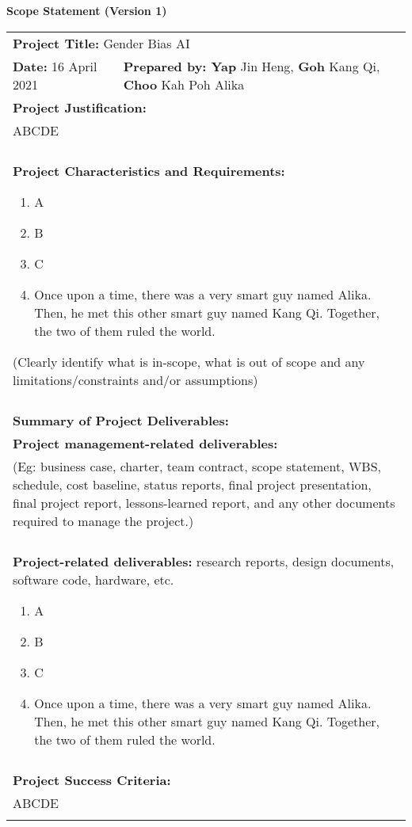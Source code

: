 \begin{center}
    \textbf{Scope Statement (Version 1)}
\end{center}

\begin{longtable}{ | p{} l | }
    \hline
    \multicolumn{2}{|l|}{\textbf{Project Title:} Gender Bias AI} \\
    \textbf{Date:} 16 April 2021 &
    \textbf{Prepared by: Yap} Jin Heng, \textbf{Goh} Kang Qi, \textbf{Choo} Kah Poh Alika \\
    \hline
    \multicolumn{2}{|l|}{\textbf{Project Justification:}} \\
    \multicolumn{2}{|p{\textwidth}|}{ABCDE} \\
    & \\
    \hline
    \multicolumn{2}{|p{\textwidth}|}{\textbf{Project Characteristics and Requirements:}
        \begin{enumerate}
            \item A
            \item B
            \item C
            \item Once upon a time, there was a very smart guy named Alika. Then, he met this other smart guy named Kang Qi. Together, the two of them ruled the world.
        \end{enumerate}
    (Clearly identify what is in-scope, what is out of scope and any limitations/constraints and/or assumptions)
    } \\
    & \\
    \hline
    \multicolumn{2}{|l|}{\textbf{Summary of Project Deliverables:}} \\
    \multicolumn{2}{|l|}{\textbf{Project management-related deliverables:}} \\
    \multicolumn{2}{|p{\textwidth}|}{(Eg: business case, charter, team contract, scope statement, WBS, schedule, cost baseline, status reports, final project presentation, final project report, lessons-learned report, and any other documents required to manage the project.)} \\
    & \\
    \multicolumn{2}{|p{\textwidth}|}{\textbf{Project-related deliverables:} research reports, design documents, software code, hardware, etc.
        \begin{enumerate}
            \item A
            \item B
            \item C
            \item Once upon a time, there was a very smart guy named Alika. Then, he met this other smart guy named Kang Qi. Together, the two of them ruled the world.
        \end{enumerate}
    } \\
    & \\
    \hline
    \multicolumn{2}{|l|}{\textbf{Project Success Criteria:}} \\
    \multicolumn{2}{|p{\textwidth}|}{ABCDE} \\
    & \\
    \hline
\end{longtable}
